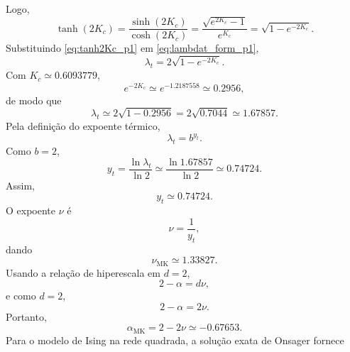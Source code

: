 \documentclass[12pt,a4paper]{article}
\begin{document}
%
Logo,
%
\begin{equation}
    \tanh(2K_c)
    =
    \frac{\sinh(2K_c)}{\cosh(2K_c)}
    =
    \frac{\sqrt{e^{2K_c}-1}}{e^{K_c}}
    =
    \sqrt{1-e^{-2K_c}}.
    \label{eq:tanh2Kc_p1}
\end{equation}
%
Substituindo \eqref{eq:tanh2Kc_p1} em \eqref{eq:lambdat_form_p1},
%
\begin{equation}
    \lambda_t
    =
    2\sqrt{1-e^{-2K_c}}.
    \label{eq:lambdat_sqrt_p1}
\end{equation}
%
Com \(K_c\simeq0.6093779\),
%
\begin{equation}
    e^{-2K_c}
    \simeq
    e^{-1.2187558}
    \simeq
    0.2956,
\end{equation}
%
de modo que
%
\begin{equation}
    \lambda_t
    \simeq
    2\sqrt{1-0.2956}
    =
    2\sqrt{0.7044}
    \simeq
    1.67857.
    \label{eq:lambdat_p1}
\end{equation}
%
Pela definição do expoente térmico,
%
\begin{equation}
    \lambda_t=b^{y_t}.
\end{equation}
%
Como \(b=2\),
%
\begin{equation}
    y_t
    =
    \frac{\ln\lambda_t}{\ln 2}
    \simeq
    \frac{\ln 1.67857}{\ln 2}
    \simeq
    0.74724.
    \label{eq:yt_p1}
\end{equation}
%
Assim,
%
\begin{equation}
    \boxed{
    y_t\simeq0.74724.
    }
    \label{eq:yt_box_p1}
\end{equation}
%
O expoente \(\nu\) é
%
\begin{equation}
    \nu=\frac{1}{y_t},
\end{equation}
%
dando
%
\begin{equation}
    \boxed{
    \nu_{\mathrm{MK}}\simeq1.33827.
    }
    \label{eq:nu_p1}
\end{equation}
%
Usando a relação de hiperescala em \(d=2\),
%
\begin{equation}
    2-\alpha=d\nu,
\end{equation}
%
e como \(d=2\),
%
\begin{equation}
    2-\alpha=2\nu.
\end{equation}
%
Portanto,
%
\begin{equation}
    \boxed{
    \alpha_{\mathrm{MK}}
    =
    2-2\nu
    \simeq-0.67653.
    }
    \label{eq:alpha_p1}
\end{equation}
% 
Para o modelo de Ising na rede quadrada, a solução exata de Onsager fornece
\end{document}
